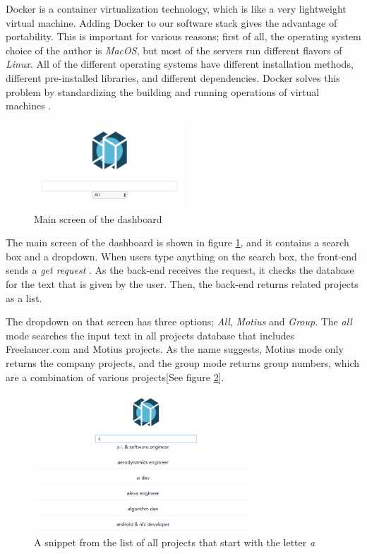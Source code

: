 Docker is a container virtualization technology, which is like a very lightweight virtual machine. Adding Docker to our software stack gives the advantage of portability. This is important for various reasons; first of all, the operating system choice of the author is \textit{MacOS}, but most of the servers run different flavors of \textit{Linux}. All of the different operating systems have different installation methods, different pre-installed libraries, and different dependencies. Docker solves this problem by standardizing the building and running operations of virtual machines \cite{anderson2015docker}.


\begin{figure}[htp]
	\centering
	\includegraphics[width=0.5\textwidth]{figures/DashboardMain.png}
	\caption{Main screen of the dashboard}
	\label{fig:dashboard-main}
\end{figure}


The main screen of the dashboard is shown in figure \ref{fig:dashboard-main}, and it contains a search box and a dropdown. When users type anything on the search box, the front-end sends a \textit{get request} \cite{masse2011rest}. As the back-end receives the request, it checks the database for the text that is given by the user. Then, the back-end returns related projects as a list. 


The dropdown on that screen has three options; \textit{All},  \textit{Motius} and  \textit{Group}. The \textit{all} mode searches the input text in all projects database that includes Freelancer.com and Motius projects. As the name suggests, Motius mode only returns the company projects, and the group mode returns group numbers, which are a combination of various projects[See figure \ref{fig:dashboard-projects}]. 

\begin{figure}[htp]
	\centering
	\includegraphics[width=0.75\textwidth]{figures/DashboardProjects.png}
	\caption{A snippet from the list of all projects that start with the letter \textit{a}}
	\label{fig:dashboard-projects}
\end{figure}

